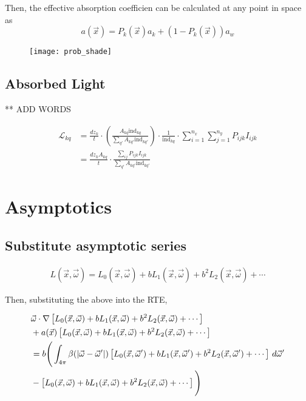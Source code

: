 Then, the effective absorption coefficien can be calculated at any point in space as
\begin{equation}
  a(\vec{x}) = P_k(\vec{x})a_k + (1-P_k(\vec{x}))a_w
\end{equation}

\begin{figure}[h]
	\centering
	\texttt{[image: prob\_shade]}
	\vspace{-2em}
	\label{fig:prob_shade}
\end{figure}

\subsection{Absorbed Light}
** ADD WORDS

\newcommand{\abslight}{\mathcal{L}}
\begin{align}
  \abslight_{kq} &= \frac{dz_k}{t}
  \cdot \left(\frac{A_{kq}\mbox{ind}_{kq}}{\sum_{q'}A_{kq'}\mbox{ind}_{kq'}}\right)
  \cdot \frac{1}{\mbox{ind}_{kq}}
  \cdot \sum_{i=1}^{n_x}\sum_{j=1}^{n_y}P_{ijk}I_{ijk} \\
  &= \frac{dz_k A_{kq}}{t}
  \cdot \frac{\sum_{ij}P_{ijk}I_{ijk}}{\sum_{q'}A_{kq'}\mbox{ind}_{kq'}}
\end{align}


\section{Asymptotics}
\subsection{Substitute asymptotic series}
\newcommand{\Lasym}{L_0(\vec{x},\vec{\omega}) + b L_1(\vec{x},\vec{\omega}) + b^2 L_2(\vec{x},\vec{\omega}) + \cdots}
\newcommand{\Lasymp}{L_0(\vec{x},\vec{\omega}') + b L_1(\vec{x},\vec{\omega}') + b^2 L_2(\vec{x},\vec{\omega}') + \cdots}
\begin{align}
  L(\vec{x},\vec{\omega}) = \Lasym
\end{align}

Then, substituting the above into the RTE,

\begin{equation}
  \begin{split}
    &\vec{\omega} \cdot \nabla \left[ \Lasym \right] \\
    &+ a(\vec{x}) \left[ \Lasym \right] \\
    &= b\Bigg(
      \int_{4\pi} \beta(\abs{\vec{\omega} - \vec{\omega}'})
      \left[ \Lasymp \right] \, d\vec{\omega}' \\
    &- \left[ \Lasym \right]
    \Bigg)
    \end{split}
\end{equation}

